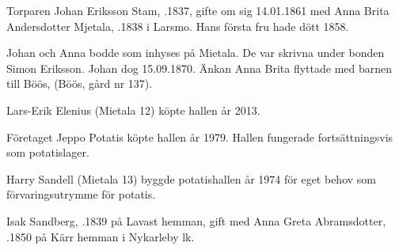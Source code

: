 %
Torparen Johan Eriksson Stam, .1837, gifte om sig 14.01.1861 med Anna Brita Andersdotter Mjetala,  .1838 i Larsmo. Hans första fru hade dött 1858.
\begin{jhchildren}
  \item {}
  \item {}
  \item {}
  \item {}
\end{jhchildren}

Johan och Anna bodde som inhyses på Mietala. De var skrivna under bonden Simon Eriksson. Johan dog 15.09.1870. Änkan Anna Brita flyttade med barnen till Böös, (Böös, gård nr 137).



%


%
Lars-Erik Elenius (Mietala 12) köpte hallen år 2013.\jhvspace{}


%
Företaget Jeppo Potatis köpte hallen år 1979. Hallen fungerade fortsättningsvis som potatislager.\jhvspace{}


%
Harry Sandell (Mietala 13) byggde potatishallen år 1974 för eget behov som förvaringsutrymme för potatis.\jhvspace{}



%


%
Isak Sandberg, .1839 på Lavast hemman, gift med Anna Greta Abramsdotter,  .1850 på Kärr hemman i Nykarleby lk.
\begin{jhchildren}
  \item {}
  \item {}
  \item {}
  \item {}
  \item {}
  \item {}
  \item {}
\end{jhchildren}

